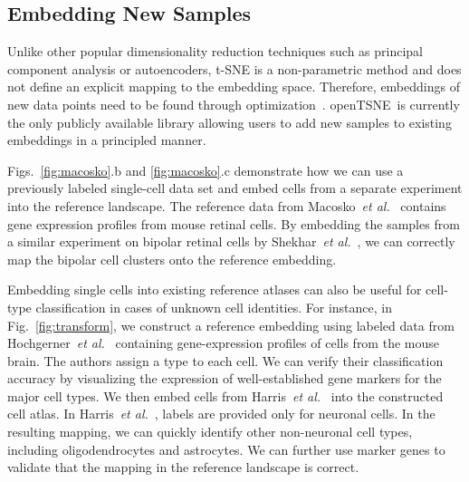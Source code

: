 \documentclass[letter]{article}
\newcommand{\opentsne}{\textsf{openTSNE}}
\begin{document}
\subsection*{Embedding New Samples}

Unlike other popular dimensionality reduction techniques such as principal
component analysis or autoencoders, t-SNE is a non-parametric method and does
not define an explicit mapping to the embedding space. Therefore, embeddings of
new data points need to be found through
optimization~\cite{policar2019embedding}. \opentsne\ is currently the only
publicly available library allowing users to add new samples to existing
embeddings in a principled manner.

Figs.~\ref{fig:macosko}.b and \ref{fig:macosko}.c demonstrate how we can use a
previously labeled single-cell data set and embed cells from a separate
experiment into the reference landscape. The reference data from
Macosko~\textit{et al.}~\cite{macosko2015highly} contains gene expression
profiles from mouse retinal cells. By embedding the samples from a similar
experiment on bipolar retinal cells by Shekhar~\textit{et
al.}~\cite{shekhar2016comprehensive}, we can correctly map the bipolar cell
clusters onto the reference embedding.

Embedding single cells into existing reference atlases can also be useful for
cell-type classification in cases of unknown cell identities. For instance, in
Fig.~\ref{fig:transform}, we construct a reference embedding using labeled data
from Hochgerner~\textit{et al.}~\cite{hochgerner2018conserved} containing
gene-expression profiles of cells from the mouse brain. The authors assign a
type to each cell. We can verify their classification accuracy by visualizing
the expression of well-established gene markers for the major cell types. We
then embed cells from Harris~\textit{et al.}~\cite{harris2018classes} into the
constructed cell atlas. In Harris~\textit{et al.}~, labels are provided only for
neuronal cells. In the resulting mapping, we can quickly identify other
non-neuronal cell types, including oligodendrocytes and astrocytes. We can
further use marker genes to validate that the mapping in the reference landscape
is correct. 
\end{document}

